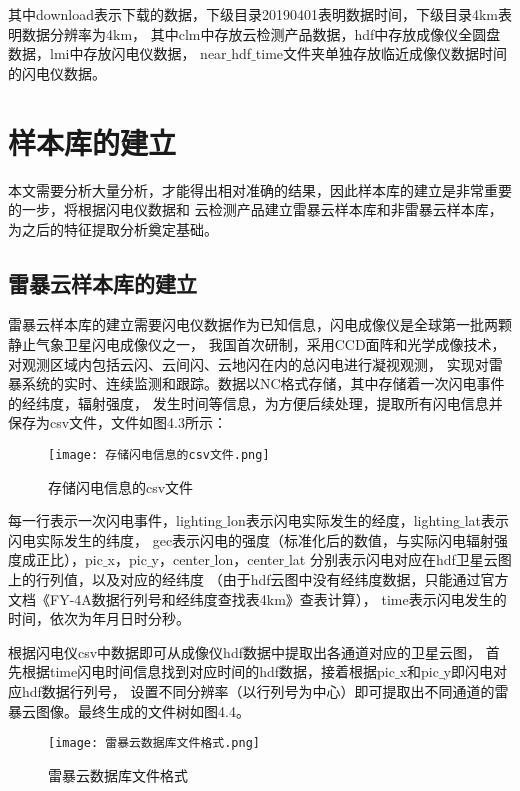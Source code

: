 其中download表示下载的数据，下级目录20190401表明数据时间，下级目录4km表明数据分辨率为4km，
其中clm中存放云检测产品数据，hdf中存放成像仪全圆盘数据，lmi中存放闪电仪数据，
near$\_$hdf$\_$time文件夹单独存放临近成像仪数据时间的闪电仪数据。


\section{样本库的建立}
本文需要分析大量分析，才能得出相对准确的结果，因此样本库的建立是非常重要的一步，将根据闪电仪数据和
云检测产品建立雷暴云样本库和非雷暴云样本库，为之后的特征提取分析奠定基础。

\subsection{雷暴云样本库的建立}
雷暴云样本库的建立需要闪电仪数据作为已知信息，闪电成像仪是全球第一批两颗静止气象卫星闪电成像仪之一，
我国首次研制，采用CCD面阵和光学成像技术，对观测区域内包括云闪、云间闪、云地闪在内的总闪电进行凝视观测，
实现对雷暴系统的实时、连续监测和跟踪。数据以NC格式存储，其中存储着一次闪电事件的经纬度，辐射强度，
发生时间等信息，为方便后续处理，提取所有闪电信息并保存为csv文件，文件如图4.3所示：

\begin{figure}[htb]
    \centering
    \texttt{[image: 存储闪电信息的csv文件.png]}
    \caption{存储闪电信息的csv文件}
\end{figure}


每一行表示一次闪电事件，lighting$\_$lon表示闪电实际发生的经度，lighting$\_$lat表示闪电实际发生的纬度，
gec表示闪电的强度（标准化后的数值，与实际闪电辐射强度成正比），pic$\_$x，pic$\_$y，center$\_$lon，center$\_$lat
分别表示闪电对应在hdf卫星云图上的行列值，以及对应的经纬度
（由于hdf云图中没有经纬度数据，只能通过官方文档《FY-4A数据行列号和经纬度查找表4km》查表计算），
time表示闪电发生的时间，依次为年月日时分秒。

根据闪电仪csv中数据即可从成像仪hdf数据中提取出各通道对应的卫星云图，
首先根据time闪电时间信息找到对应时间的hdf数据，接着根据pic$\_$x和pic$\_$y即闪电对应hdf数据行列号，
设置不同分辨率（以行列号为中心）即可提取出不同通道的雷暴云图像。最终生成的文件树如图4.4。

\begin{figure}[htb]
    \centering
    \texttt{[image: 雷暴云数据库文件格式.png]}
    \caption{雷暴云数据库文件格式}
\end{figure}

